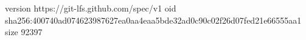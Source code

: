 version https://git-lfs.github.com/spec/v1
oid sha256:400740ad074623987627ea0aa4eaa5bde32ad0c90c02f26d07fed21e66555aa1
size 92397
